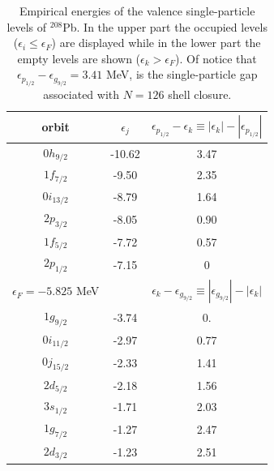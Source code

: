 \begin{table}
	\begin{center}
\begin{tabular}{|c|c|c|}
\hline \rule[-2ex]{0pt}{5.5ex}   orbit& $\epsilon_j$  & $\epsilon_{p_{1/2}}-\epsilon_k\equiv|\epsilon_k|-|\epsilon_{p_{1/2}}|$  \\ 
\hline
$0h_{9/2}$&-10.62 &3.47\\
$1f_{7/2}$& -9.50&2.35\\
$0i_{13/2}$& -8.79&1.64\\
$2p_{3/2}$& -8.05&0.90\\
$1f_{5/2}$& -7.72&0.57\\
$2p_{1/2}$& -7.15&0\\
\hline \rule[-2ex]{0pt}{5.5ex}   $\epsilon_F=-5.825$ MeV&   & $\epsilon_k-\epsilon_{g_{9/2}}\equiv|\epsilon_{g_{9/2}}|-|\epsilon_k|$  \\ 
\hline
$1g_{9/2}$&-3.74 &0.\\
$0i_{11/2}$& -2.97&0.77\\
$0j_{15/2}$& -2.33&1.41\\
$2d_{5/2}$& -2.18&1.56\\
$3s_{1/2}$& -1.71&2.03\\
$1g_{7/2}$& -1.27&2.47\\
$2d_{3/2}$& -1.23&2.51\\
\hline
\end{tabular}
\end{center}
\caption{Empirical energies of the valence single-particle levels of $^{208}$Pb. In the upper part the occupied levels ($\epsilon_i\leq\epsilon_F$) are displayed while in the lower part the empty levels are shown ($\epsilon_k>\epsilon_F$). Of notice that $\epsilon_{p_{1/2}}-\epsilon_{g_{9/2}}=3.41$ MeV, is the single-particle gap associated with $N=126$ shell closure.}\label{tab1E1}
 \end{table}
 

